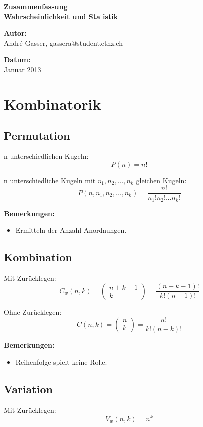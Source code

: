 \documentclass[10pt,a4paper,twocolumn]{article}
\begin{document}
\begin{center}
\textbf{Zusammenfassung\\ Wahrscheinlichkeit und Statistik}

\vspace{10pt}

\textbf{Autor:}\\
André Gasser, gassera@student.ethz.ch

\vspace{10pt}

\textbf{Datum:}\\
Januar 2013
\end{center}

\section{Kombinatorik}

\subsection{Permutation}
n unterschiedlichen Kugeln:
\[
P(n)=n!
\]

n unterschiedliche Kugeln mit $n_1,n_2,...,n_k$ gleichen Kugeln:
\[
P(n,n_1,n_2,...,n_k)=\frac{n!}{n_1!n_2!...n_k!}
\]

\textbf{Bemerkungen:}
\begin{itemize}
\item Ermitteln der Anzahl Anordnungen.
\end{itemize}

\subsection{Kombination}
Mit Zurücklegen:
\[
C_w(n,k)=\left( 
	\begin{array}{c}
		n+k-1 \\
		k
	\end{array}
\right) =
\frac{(n+k-1)!}{k!(n-1)!}
\]

Ohne Zurücklegen:
\[
C(n,k)=\left( 
	\begin{array}{c}
		n \\
		k
	\end{array}
\right) =
\frac{n!}{k!(n-k)!}
\]

\textbf{Bemerkungen:}
\begin{itemize}
\item Reihenfolge spielt keine Rolle.
\end{itemize}

\subsection{Variation}
Mit Zurücklegen:
\[
V_w(n,k)=n^k
\]
\end{document}
